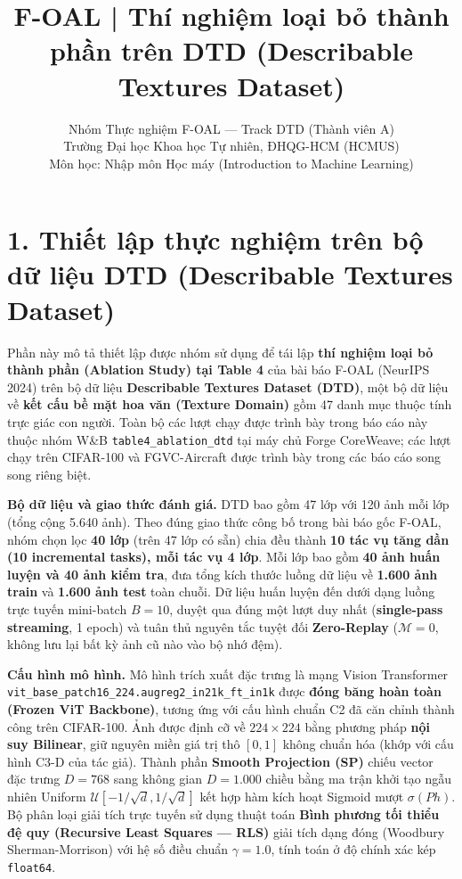 \documentclass{article}
\title{F-OAL | Thí nghiệm loại bỏ thành phần trên DTD (Describable Textures Dataset)}
\author{%
Nhóm Thực nghiệm F-OAL — Track DTD (Thành viên A) \\
Trường Đại học Khoa học Tự nhiên, ĐHQG-HCM (HCMUS) \\
Môn học: Nhập môn Học máy (Introduction to Machine Learning)
}
\begin{document}
\maketitle

\section{1. Thiết lập thực nghiệm trên bộ dữ liệu DTD (Describable Textures Dataset)}
Phần này mô tả thiết lập được nhóm sử dụng để tái lập \textbf{thí nghiệm loại bỏ thành phần (Ablation Study) tại Table 4} của bài báo F-OAL (NeurIPS 2024) trên bộ dữ liệu \textbf{Describable Textures Dataset (DTD)}, một bộ dữ liệu về \textbf{kết cấu bề mặt hoa văn (Texture Domain)} gồm 47 danh mục thuộc tính trực giác con người. Toàn bộ các lượt chạy được trình bày trong báo cáo này thuộc nhóm W\&B \texttt{table4\_ablation\_dtd} tại máy chủ Forge CoreWeave; các lượt chạy trên CIFAR-100 và FGVC-Aircraft được trình bày trong các báo cáo song song riêng biệt.

\textbf{Bộ dữ liệu và giao thức đánh giá.} DTD bao gồm 47 lớp với 120 ảnh mỗi lớp (tổng cộng 5.640 ảnh). Theo đúng giao thức công bố trong bài báo gốc F-OAL, nhóm chọn lọc \textbf{40 lớp} (trên 47 lớp có sẵn) chia đều thành \textbf{10 tác vụ tăng dần (10 incremental tasks), mỗi tác vụ 4 lớp}. Mỗi lớp bao gồm \textbf{40 ảnh huấn luyện và 40 ảnh kiểm tra}, đưa tổng kích thước luồng dữ liệu về \textbf{1.600 ảnh train} và \textbf{1.600 ảnh test} toàn chuỗi. Dữ liệu huấn luyện đến dưới dạng luồng trực tuyến mini-batch $B = 10$, duyệt qua đúng một lượt duy nhất (\textbf{single-pass streaming}, 1 epoch) và tuân thủ nguyên tắc tuyệt đối \textbf{Zero-Replay} ($\mathcal{M} = 0$, không lưu lại bất kỳ ảnh cũ nào vào bộ nhớ đệm).

\textbf{Cấu hình mô hình.} Mô hình trích xuất đặc trưng là mạng Vision Transformer \texttt{vit\_base\_patch16\_224.augreg2\_in21k\_ft\_in1k} được \textbf{đóng băng hoàn toàn (Frozen ViT Backbone)}, tương ứng với cấu hình chuẩn C2 đã căn chỉnh thành công trên CIFAR-100. Ảnh được định cỡ về $224 \times 224$ bằng phương pháp \textbf{nội suy Bilinear}, giữ nguyên miền giá trị thô $[0, 1]$ không chuẩn hóa (khớp với cấu hình C3-D của tác giả). Thành phần \textbf{Smooth Projection (SP)} chiếu vector đặc trưng $D=768$ sang không gian $D=1.000$ chiều bằng ma trận khởi tạo ngẫu nhiên Uniform $\mathcal{U}[-1/\sqrt{d}, 1/\sqrt{d}]$ kết hợp hàm kích hoạt Sigmoid mượt $\sigma(P h)$. Bộ phân loại giải tích trực tuyến sử dụng thuật toán \textbf{Bình phương tối thiểu đệ quy (Recursive Least Squares — RLS)} giải tích dạng đóng (Woodbury Sherman-Morrison) với hệ số điều chuẩn $\gamma = 1.0$, tính toán ở độ chính xác kép \texttt{float64}.
\end{document}
